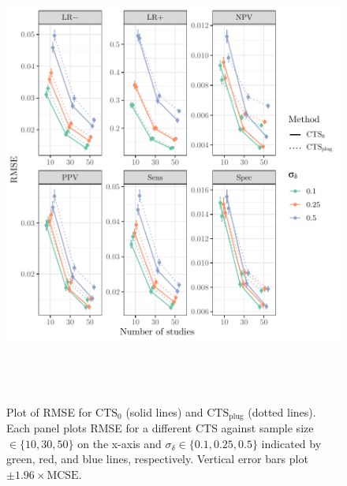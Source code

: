 \documentclass[AMA,STIX1COL]{WileyNJD-v2}
\newcommand{\CTSo}{\text{CTS}_0}
\newcommand{\CTSp}{\text{CTS}_{\text{plug}}}
\begin{document}
\begin{figure}
\includegraphics[height = 6in, width = 6in]{rmse_plot.pdf}
\caption{Plot of RMSE for $\CTSo$ (solid lines) and $\CTSp$ (dotted lines). Each panel plots RMSE for a different CTS against sample size $\in \{10, 30, 50\}$ on the x-axis and $\sigma_{\delta} \in \{0.1, 0.25, 0.5\}$ indicated by green, red, and blue lines, respectively. Vertical error bars plot $\pm 1.96 \times \text{MCSE}$.}
\label{fig:cts_rmse}
\end{figure}
\end{document}
